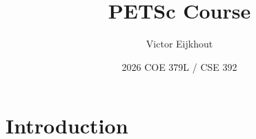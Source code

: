 \documentclass[11pt]{beamer}
\author[Eijkhout]{Victor Eijkhout}
\date[2026]{2026 COE 379L / CSE 392}
\title[PETSc]{PETSc Course}
\begin{document}
\frame{\titlepage}

\section{Introduction}


\begin{standalone}

\end{standalone}

\begin{longstory}
  
\end{longstory}





\begin{longstory}
  
  
  
  
  
\end{longstory}
\end{document}
